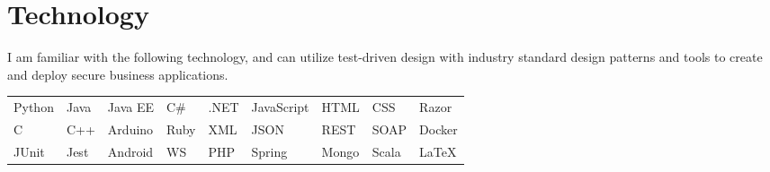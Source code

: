 \documentclass[]{rcf_cv}
\begin{document}
	\section{Technology}
	
		I am familiar with the following technology, and can utilize test-driven design with industry standard design patterns and tools to create and deploy secure business applications. \\
	
	\begin{tabular}{l l l l l l l l l}
		Python & Java & Java EE & C\# & .NET & JavaScript & HTML & CSS & Razor \\
		
		C & C++ & Arduino & Ruby & XML & JSON & REST & SOAP & Docker \\
		
		JUnit & Jest & Android & WS & PHP & Spring & Mongo & Scala & \LaTeX
		
	\end{tabular}
	
\end{document}
